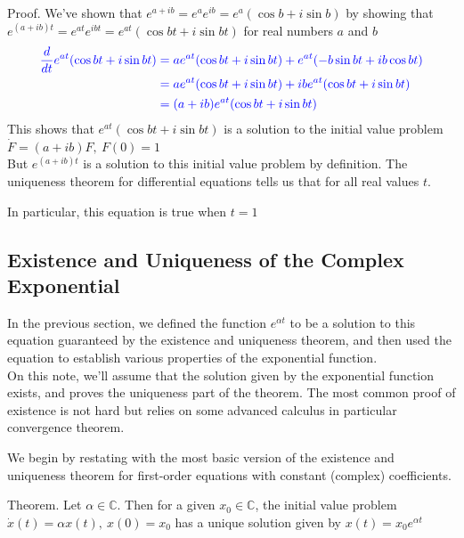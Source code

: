 \documentclass[11pt, openright]{book}
\begin{document}
\begin{dent}{Proof.}
    We've shown that $e^{a+ib}=e^ae^{ib}=e^a(\cos b+i\sin b)$ by showing that $e^{(a+ib)t}=e^{at}e^{ibt}=e^{at}(\cos bt+i\sin bt)$ for real numbers $a$ and $b$
    \vspace{-7pt}
    \begin{align*}
        \color{blue} \frac{d}{dt}e^{at}(\cos bt+i\sin bt) & \color{blue}=ae^{at}(\cos bt+i\sin bt)+e^{at}(-b\sin bt+ib\cos bt) \\
                                                  & \color{blue}=ae^{at}(\cos bt+i\sin bt)+ibe^{at}(\cos bt+i\sin bt)  \\
                                                  & \color{blue}=(a+ib)e^{at}(\cos bt+i\sin bt)
    \end{align*}
    This shows that $e^{at}(\cos bt + i\sin bt)$ is a solution to the initial value problem $\dot{F}=(a+ib)F,\ F(0)=1$\\
    But $e^{(a+ib)t}$ is a solution to this initial value problem by definition. The uniqueness theorem for differential equations tells us that for all real values $t$.

    In particular, this equation is true when $t=1$
\end{dent}

\subsection{Existence and Uniqueness of the Complex Exponential}

In the previous section, we defined the function $e^{\alpha t}$ to be a solution to this equation guaranteed by the existence and uniqueness theorem, and then used the equation to establish various properties of the exponential function.\\
On this note, we'll assume that the solution given by the exponential function exists, and proves the uniqueness part of the theorem. The most common proof of existence is not hard but relies on some advanced calculus in particular convergence theorem.

We begin by restating with the most basic version of the existence and uniqueness theorem for first-order equations with constant (complex) coefficients.

\begin{dent}{Theorem.}
    Let $\alpha\in\mathbb{C}$. Then for a given $x_0\in \mathbb{C}$, the initial value problem $\dot{x}(t)=\alpha x(t),\ x(0)=x_0$ has a unique solution given by $x(t)=x_0e^{\alpha t}$
\end{dent}
\end{document}
